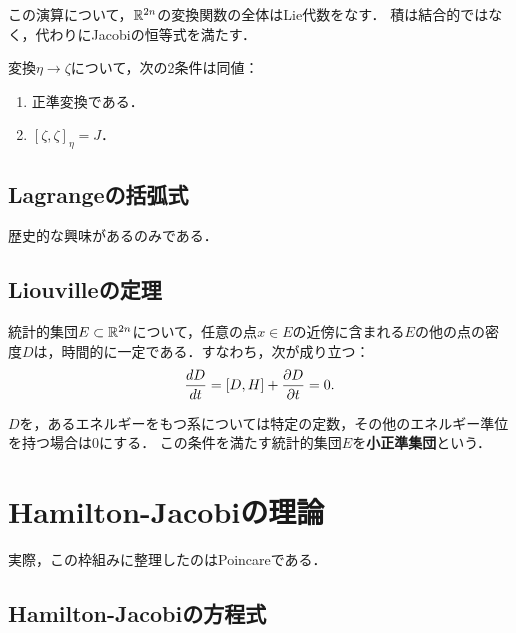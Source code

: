 \documentclass[uplatex, dvipdfmx]{jsreport}
\begin{document}
\begin{lemma}
    この演算について，$\mathbb{R}^{2n}$の変換関数の全体はLie代数をなす．
    積は結合的ではなく，代わりにJacobiの恒等式を満たす．
\end{lemma}

\begin{proposition}
    変換$\eta\to\zeta$について，次の2条件は同値：
    \begin{enumerate}
        \item 正準変換である．
        \item $[\zeta,\zeta]_\eta=J$．
    \end{enumerate}
\end{proposition}

\subsection{Lagrangeの括弧式}

歴史的な興味があるのみである．

\subsection{Liouvilleの定理}

\begin{theorem}
    統計的集団$E\subset\mathbb{R}^{2n}$について，任意の点$x\in E$の近傍に含まれる$E$の他の点の密度$D$は，時間的に一定である．すなわち，次が成り立つ：
    \[\frac{d D}{d t}=[D,H]+\frac{\partial D}{\partial t}=0.\]
\end{theorem}

\begin{definition}
    $D$を，あるエネルギーをもつ系については特定の定数，その他のエネルギー準位を持つ場合は$0$にする．
    この条件を満たす統計的集団$E$を\textbf{小正準集団}という．
\end{definition}

\section{Hamilton-Jacobiの理論}

\begin{tcolorbox}[colframe=ForestGreen, colback=ForestGreen!10!white,breakable,colbacktitle=ForestGreen!40!white,coltitle=black,fonttitle=\bfseries\sffamily,
title=]
    実際，この枠組みに整理したのはPoincareである．
\end{tcolorbox}

\subsection{Hamilton-Jacobiの方程式}
\end{document}
